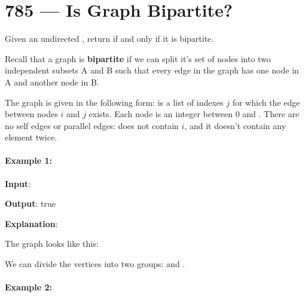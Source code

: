 \section{785 --- Is Graph Bipartite?}
Given an undirected , return  if and only if it is bipartite.

Recall that a graph is \textbf{bipartite} if we can split it's set of nodes into two independent subsets A and B such that every edge in the graph has one node in A and another node in B.

The graph is given in the following form:  is a list of indexes $j$ for which the edge between nodes $i$ and $j$ exists. Each node is an integer between 0 and .  There are no self edges or parallel edges:  does not contain $i$, and it doesn't contain any element twice.

\paragraph{Example 1:}
\begin{flushleft}
\textbf{Input}: \fcj{[[1,3], [0,2], [1,3], [0,2]]}

\textbf{Output}: true

\textbf{Explanation}: 

The graph looks like this:
\begin{figure}[H]
\end{figure}
We can divide the vertices into two groups:  and .


\end{flushleft}

\paragraph{Example 2:}


